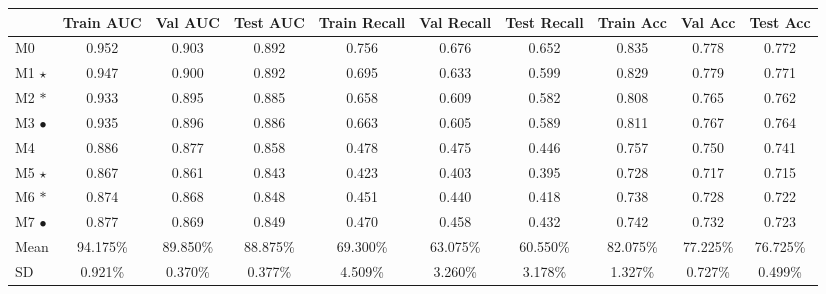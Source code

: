 \begin{landscape}

  \begin{table}
    \centering
    \begin{tabular}{lccccccccc}
      \toprule
      & \textbf{Train AUC} & \textbf{Val AUC} & \textbf{Test AUC} & \textbf{Train Recall} & \textbf{Val Recall} & \textbf{Test Recall} & \textbf{Train Acc} & \textbf{Val Acc} & \textbf{Test Acc} \\
      \midrule
      M0 & 0.952 & 0.903 & 0.892 & 0.756 & 0.676 & 0.652 & 0.835 & 0.778 & 0.772 \\
      M1 $\star$ & 0.947 & 0.900 & 0.892 & 0.695 & 0.633 & 0.599 & 0.829 & 0.779 & 0.771 \\
      M2 $\ast$ & 0.933 & 0.895 & 0.885 & 0.658 & 0.609 & 0.582 & 0.808 & 0.765 & 0.762 \\
      M3 $\bullet$ & 0.935 & 0.896 & 0.886 & 0.663 & 0.605 & 0.589 & 0.811 & 0.767 & 0.764 \\
      \midrule
      \cellcolor{gray!50}M4 & \cellcolor{gray!50}0.886 & \cellcolor{gray!50}0.877 & \cellcolor{gray!50}0.858 & \cellcolor{gray!50}0.478 & \cellcolor{gray!50}0.475 & \cellcolor{gray!50}0.446 & \cellcolor{gray!50}0.757 & \cellcolor{gray!50}0.750 & \cellcolor{gray!50}0.741 \\
      \cellcolor{gray!50}M5 $\star$ & \cellcolor{gray!50}0.867 & \cellcolor{gray!50}0.861 & \cellcolor{gray!50}0.843 & \cellcolor{gray!50}0.423 & \cellcolor{gray!50}0.403 & \cellcolor{gray!50}0.395 & \cellcolor{gray!50}0.728 & \cellcolor{gray!50}0.717 &  \cellcolor{gray!50}0.715 \\
      \cellcolor{gray!50}M6 $\ast$ & \cellcolor{gray!50}0.874 & \cellcolor{gray!50}0.868 & \cellcolor{gray!50}0.848 & \cellcolor{gray!50}0.451 & \cellcolor{gray!50}0.440 & \cellcolor{gray!50}0.418 & \cellcolor{gray!50}0.738 & \cellcolor{gray!50}0.728 &  \cellcolor{gray!50}0.722 \\
      \cellcolor{gray!50}M7 $\bullet$ & \cellcolor{gray!50}0.877 & \cellcolor{gray!50}0.869 & \cellcolor{gray!50}0.849 & \cellcolor{gray!50}0.470 & \cellcolor{gray!50}0.458 & \cellcolor{gray!50}0.432 & \cellcolor{gray!50}0.742 & \cellcolor{gray!50}0.732 &  \cellcolor{gray!50}0.723 \\

      \midrule

      Mean &  94.175\% & 89.850\% & 88.875\%  & 69.300\% & 63.075\% & 60.550\% & 82.075\% & 77.225\% & 76.725\% \\
      SD   & 0.921\% & 0.370\% & 0.377\%  &  4.509\% & 3.260\% & 3.178\% & 1.327\% & 0.727\% & 0.499\% \\


\end{tabular}
\end{table}
\end{landscape}
